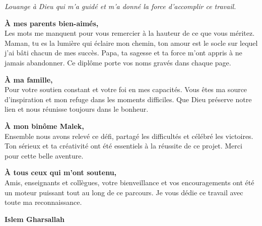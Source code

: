 \newpage
\thispagestyle{empty}

\vspace*{1cm}

\begin{center}

    \textit{Louange à Dieu qui m'a guidé et m'a donné la force d'accomplir ce travail.}

    \vspace{0.8cm}

    \textbf{À mes parents bien-aimés,}\\[0.3cm]
    Les mots me manquent pour vous remercier à la hauteur de ce que vous méritez.
    Maman, tu es la lumière qui éclaire mon chemin, ton amour est le socle
    sur lequel j'ai bâti chacun de mes succès.
    Papa, ta sagesse et ta force m'ont appris à ne jamais abandonner.
    Ce diplôme porte vos noms gravés dans chaque page.

    \vspace{0.7cm}

    \textbf{À ma famille,}\\[0.3cm]
    Pour votre soutien constant et votre foi en mes capacités.
    Vous êtes ma source d'inspiration et mon refuge dans les moments difficiles.
    Que Dieu préserve notre lien et nous réunisse toujours dans le bonheur.

    \vspace{0.7cm}

    \textbf{À mon binôme Malek,}\\[0.3cm]
    Ensemble nous avons relevé ce défi, partagé les difficultés
    et célébré les victoires. Ton sérieux et ta créativité ont été
    essentiels à la réussite de ce projet. Merci pour cette belle aventure.

    \vspace{0.7cm}

    \textbf{À tous ceux qui m'ont soutenu,}\\[0.3cm]
    Amis, enseignants et collègues, votre bienveillance
    et vos encouragements ont été un moteur puissant tout au long
    de ce parcours. Je vous dédie ce travail avec toute ma reconnaissance.

    \vspace{1.5cm}

    \textbf{Islem Gharsallah}

\end{center}

